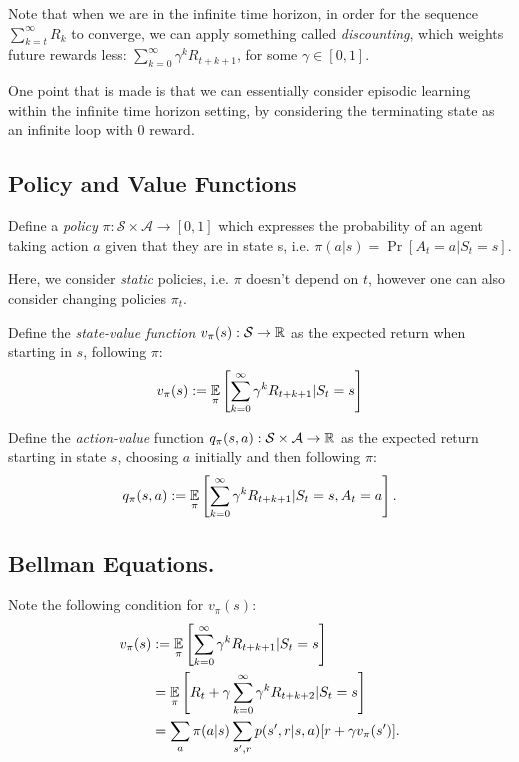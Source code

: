 \documentclass{article}
\begin{document}
Note that when we are in the infinite time horizon, in order for the sequence $\sum_{k=t}^\infty R_k$ to converge, we can apply something called \emph{discounting}, which weights future rewards less: $\sum_{k=0}^\infty \gamma^k R_{t+k+1}$, for some $\gamma \in [0,1]$.

One point that is made is that we can essentially consider episodic learning within the infinite time horizon setting, by considering the terminating state as an infinite loop with 0 reward.

\subsection{Policy and Value Functions}
\begin{definition}
Define a \emph{policy} $\pi: \mathcal{S} \times \mathcal{A} \to [0,1]$ which expresses the probability of an agent taking action $a$ given that they are in state s, i.e. $\pi(a|s) = \Pr[A_t = a |S_t = s]$. 

Here, we consider \emph{static} policies, i.e. $\pi$ doesn't depend on $t$, however one can also consider changing policies $\pi_t$.
\end{definition}

\begin{definition}
Define the \emph{state-value function} $v_\pi(s): \mathcal{S} \to \mathbb{R}$ as the expected return when starting in $s$, following $\pi$:
\begin{equation}
    v_\pi(s) := \operatorname*{\mathbb{E}}_{\pi}\left[\sum_{k=0}^\infty \gamma^k R_{t+k+1} | S_t = s\right]
\end{equation}
\end{definition}

\begin{definition}
Define the \emph{action-value} function $q_\pi(s,a): \mathcal{S}\times \mathcal{A} \to \mathbb{R}$ as the expected return starting in state $s$, choosing $a$ initially and then following $\pi$:
\begin{equation}
    q_\pi(s,a) := \operatorname*{\mathbb{E}}_\pi \left[\sum_{k=0}^\infty \gamma^k R_{t+k+1} | S_t = s, A_t=a\right].
\end{equation}
\end{definition}

\subsection{Bellman Equations.}
Note the following condition for $v_\pi(s)$:
\begin{align}
    v_\pi(s) &:= \operatorname*{\mathbb{E}}_{\pi}\left[\sum_{k=0}^\infty \gamma^k R_{t+k+1} | S_t = s\right]\\
    &= \operatorname*{\mathbb{E}}_{\pi}\left[R_t + \gamma \sum_{k=0}^\infty \gamma^k R_{t+k+2} | S_t = s\right] \\
    &= \sum_a \pi(a|s) \sum_{s',r} p(s',r|s,a) [r+\gamma v_\pi(s')].\label{eq:be1}
\end{align}
\end{document}
